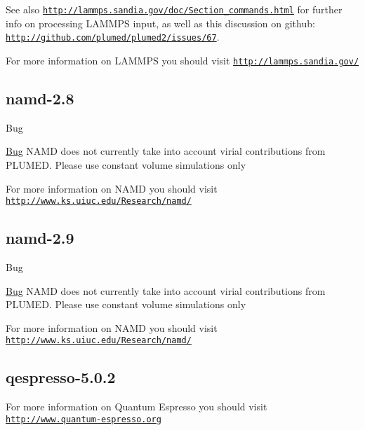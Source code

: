 See also \href{http://lammps.sandia.gov/doc/Section_commands.html}{\tt http\+://lammps.\+sandia.\+gov/doc/\+Section\+\_\+commands.\+html} for further info on processing L\+A\+M\+M\+P\+S input, as well as this discussion on github\+: \href{http://github.com/plumed/plumed2/issues/67}{\tt http\+://github.\+com/plumed/plumed2/issues/67}.

For more information on L\+A\+M\+M\+P\+S you should visit \href{http://lammps.sandia.gov/}{\tt http\+://lammps.\+sandia.\+gov/} \hypertarget{namd-2-8}{}\subsection{namd-\/2.8}\label{namd-2-8}
\begin{DoxyRefDesc}{Bug}
\item[\hyperlink{bug__bug000004}{Bug}]N\+A\+M\+D does not currently take into account virial contributions from P\+L\+U\+M\+E\+D. Please use constant volume simulations only\end{DoxyRefDesc}


For more information on N\+A\+M\+D you should visit \href{http://www.ks.uiuc.edu/Research/namd/}{\tt http\+://www.\+ks.\+uiuc.\+edu/\+Research/namd/} \hypertarget{namd-2-9}{}\subsection{namd-\/2.9}\label{namd-2-9}
\begin{DoxyRefDesc}{Bug}
\item[\hyperlink{bug__bug000005}{Bug}]N\+A\+M\+D does not currently take into account virial contributions from P\+L\+U\+M\+E\+D. Please use constant volume simulations only\end{DoxyRefDesc}


For more information on N\+A\+M\+D you should visit \href{http://www.ks.uiuc.edu/Research/namd/}{\tt http\+://www.\+ks.\+uiuc.\+edu/\+Research/namd/} \hypertarget{qespresso-5-0-2}{}\subsection{qespresso-\/5.0.2}\label{qespresso-5-0-2}
For more information on Quantum Espresso you should visit \href{http://www.quantum-espresso.org}{\tt http\+://www.\+quantum-\/espresso.\+org} 